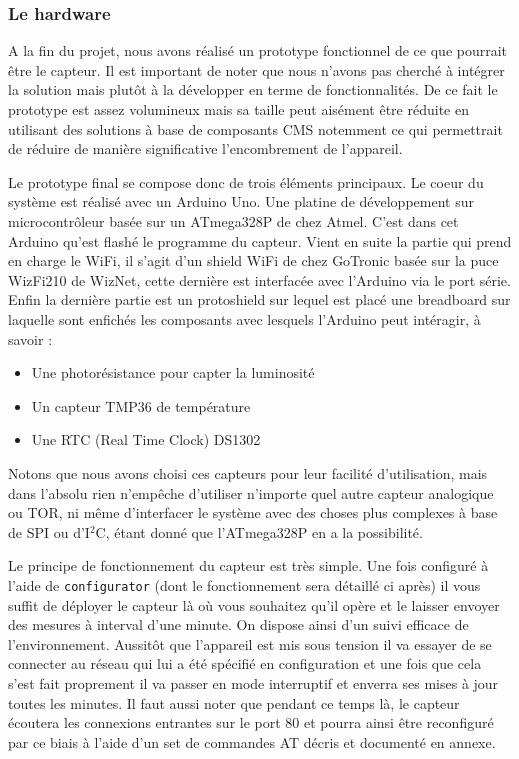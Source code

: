 		\subsubsection{Le hardware}
		\par
		A la fin du projet, nous avons réalisé un prototype fonctionnel de ce
		que pourrait être le capteur. Il est important de noter que nous n'avons
		pas cherché à intégrer la solution mais plutôt à la développer en terme
		de fonctionnalités. De ce fait le prototype est assez volumineux mais
		sa taille peut aisément être réduite en utilisant des solutions à base
		de composants CMS notemment ce qui permettrait de réduire de manière
		significative l'encombrement de l'appareil.
		\par
		Le prototype final se compose donc de trois éléments principaux. Le coeur
		du système est réalisé avec un Arduino Uno. Une platine de développement
		sur microcontrôleur basée sur un ATmega328P de chez Atmel. C'est dans cet
		Arduino qu'est flashé le programme du capteur. Vient en suite la partie
		qui prend en charge le WiFi, il s'agit d'un shield WiFi de chez GoTronic
		basée sur la puce WizFi210 de WizNet, cette dernière est interfacée avec
		l'Arduino via le port série. Enfin la dernière partie est un protoshield
		sur lequel est placé une breadboard sur laquelle sont enfichés les composants
		avec lesquels l'Arduino peut intéragir, à savoir :
		\begin{itemize}
			\item Une photorésistance pour capter la luminosité
			\item Un capteur TMP36 de température
			\item Une RTC (Real Time Clock) DS1302
		\end{itemize}
		Notons que nous avons choisi ces capteurs pour leur facilité d'utilisation,
		mais dans l'absolu rien n'empêche d'utiliser n'importe quel autre capteur
		analogique ou TOR, ni même d'interfacer le système avec des choses plus
		complexes à base de SPI ou d'I$^2$C, étant donné que l'ATmega328P en a
		la possibilité.
		\par
		Le principe de fonctionnement du capteur est très simple. Une fois configuré
		à l'aide de \texttt{configurator} (dont le fonctionnement sera détaillé ci après)
		il vous suffit de déployer le capteur là où vous souhaitez qu'il opère et le
		laisser envoyer des mesures à interval d'une minute. On dispose ainsi
		d'un suivi efficace de l'environnement. Aussitôt que l'appareil est
		mis sous tension il va essayer de se connecter au réseau qui lui a été
		spécifié en configuration et une fois que cela s'est fait proprement il
		va passer en mode interruptif et enverra ses mises à jour toutes les minutes.
		Il faut aussi noter que pendant ce temps là, le capteur écoutera les connexions
		entrantes sur le port 80 et pourra ainsi être reconfiguré par ce biais à l'aide
		d'un set de commandes AT décris et documenté en annexe.
		
